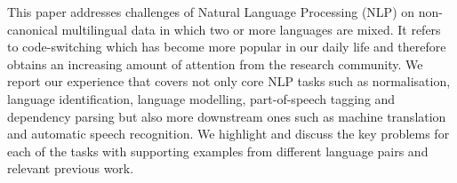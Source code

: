 This paper addresses challenges of Natural Language Processing (NLP) on non-canonical multilingual data in which two or more languages are mixed. It refers to code-switching which has become more popular in our daily life and therefore obtains an increasing amount of attention from the research community. We report our experience that covers not only core NLP tasks such as normalisation, language identification, language modelling, part-of-speech tagging and dependency parsing but also more downstream ones such as machine translation and automatic speech recognition. We highlight and discuss the key problems for each of the tasks with supporting examples from different language pairs and relevant previous work.
